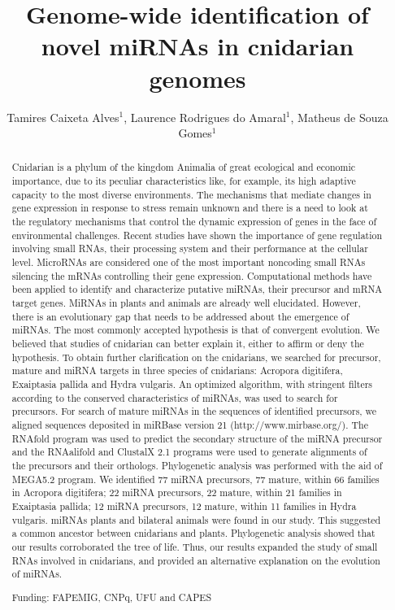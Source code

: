 \documentclass[twoside]{article}
\title{\vspace{-15mm}\fontsize{24pt}{10pt}\selectfont\textbf{Genome-wide identification of novel miRNAs in cnidarian genomes}} %
\author{Tamires Caixeta Alves$^1$, Laurence Rodrigues do Amaral$^1$, Matheus de Souza Gomes$^1$}
\affil{1 UFU\\ }
\date{}
\begin{document}
\maketitle %

\thispagestyle{fancy} %


\begin{abstract}
Cnidarian is a phylum of the kingdom Animalia of great ecological and economic importance, due to its peculiar characteristics like, for example, its high adaptive capacity to the most diverse environments. The mechanisms that mediate changes in gene expression in response to stress remain unknown and there is a need to look at the regulatory mechanisms that control the dynamic expression of genes in the face of environmental challenges. Recent studies have shown the importance of gene regulation involving small RNAs, their processing system and their performance at the cellular level. MicroRNAs are considered one of the most important noncoding small RNAs silencing the mRNAs controlling their gene expression. Computational methods have been applied to identify and characterize putative miRNAs, their precursor and mRNA target genes. MiRNAs in plants and animals are already well elucidated. However, there is an evolutionary gap that needs to be addressed about the emergence of miRNAs. The most commonly accepted hypothesis is that of convergent evolution. We believed that studies of cnidarian can better explain it, either to affirm or deny the hypothesis. To obtain further clarification on the cnidarians, we searched for precursor, mature and miRNA targets in three species of cnidarians: Acropora digitifera, Exaiptasia pallida and Hydra vulgaris. An optimized algorithm, with stringent filters according to the conserved characteristics of miRNAs, was used to search for precursors. For search of mature miRNAs in the sequences of identified precursors, we aligned sequences deposited in miRBase version 21 (http://www.mirbase.org/). The RNAfold program was used to predict the secondary structure of the miRNA precursor and the RNAalifold and ClustalX 2.1 programs were used to generate alignments of the precursors and their orthologs. Phylogenetic analysis was performed with the aid of MEGA5.2 program. We identified 77 miRNA precursors, 77 mature, within 66 families in Acropora digitifera; 22 miRNA precursors, 22 mature, within 21 families in Exaiptasia pallida; 12 miRNA precursors, 12 mature, within 11 families in Hydra vulgaris. miRNAs plants and bilateral animals were found in our study. This suggested a common ancestor between cnidarians and plants. Phylogenetic analysis showed that our results corroborated the tree of life. Thus, our results expanded the study of small RNAs involved in cnidarians, and provided an alternative explanation on the evolution of miRNAs.

Funding: FAPEMIG, CNPq, UFU and CAPES
\end{abstract}
\end{document}
